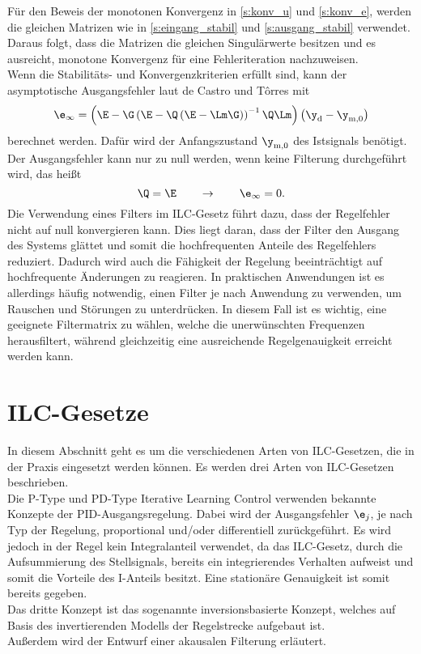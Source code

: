Für den Beweis der monotonen Konvergenz in \autoref{s:konv_u} und \autoref{s:konv_e}, werden die gleichen Matrizen wie in \autoref{s:eingang_stabil} und \autoref{s:ausgang_stabil} verwendet. Daraus folgt, dass die Matrizen die gleichen Singulärwerte besitzen und es ausreicht, monotone Konvergenz für eine Fehleriteration nachzuweisen. \\
Wenn die Stabilitäts- und Konvergenzkriterien erfüllt sind, kann der asymptotische Ausgangsfehler laut de Castro und T\^{o}rres \cite{ilc_anwendung} mit
\begin{equation}
	\label{eq:e_inf}
	\e_{\infty} = \left(\E-\G\left(\E-\Q\left(\E-\Lm\G\right)\right)^{-1}\Q\Lm\right)\left(\y_\mathrm{d} - \y_{\mathrm{m},0}\right)
\end{equation}
berechnet werden. Dafür wird der Anfangszustand $\y_{\mathrm{m},0}$ des Istsignals benötigt. Der Ausgangsfehler kann nur zu null werden, wenn keine Filterung durchgeführt wird, das heißt
\begin{equation}
	\label{eq:Q_E}
	\Q = \E \qquad \rightarrow \qquad \e_{\infty} = 0.
\end{equation}
Die Verwendung eines Filters im ILC-Gesetz führt dazu, dass der Regelfehler nicht auf null konvergieren kann. Dies liegt daran, dass der Filter den Ausgang des Systems glättet und somit die hochfrequenten Anteile des Regelfehlers reduziert. Dadurch wird auch die Fähigkeit der Regelung beeinträchtigt auf hochfrequente Änderungen zu reagieren. In praktischen Anwendungen ist es allerdings häufig notwendig, einen Filter je nach Anwendung zu verwenden, um Rauschen und Störungen zu unterdrücken. In diesem Fall ist es wichtig, eine geeignete Filtermatrix zu wählen, welche die unerwünschten Frequenzen herausfiltert, während gleichzeitig eine ausreichende Regelgenauigkeit erreicht werden kann.

\section{ILC-Gesetze}
In diesem Abschnitt geht es um die verschiedenen Arten von ILC-Gesetzen, die in der Praxis eingesetzt werden können. Es werden drei Arten von ILC-Gesetzen beschrieben. \\
Die P-Type und PD-Type Iterative Learning Control verwenden bekannte Konzepte der PID-Ausgangsregelung. Dabei wird der Ausgangsfehler $\e_j$, je nach Typ der Regelung,  proportional und/oder differentiell zurückgeführt. Es wird jedoch in der Regel kein Integralanteil verwendet, da das ILC-Gesetz, durch die Aufsummierung des Stellsignals, bereits ein integrierendes Verhalten aufweist und somit die Vorteile des I-Anteils besitzt. Eine stationäre Genauigkeit ist somit bereits gegeben. \\
Das dritte Konzept ist das sogenannte inversionsbasierte Konzept, welches auf Basis des invertierenden Modells der Regelstrecke aufgebaut ist.\\
Außerdem wird der Entwurf einer akausalen Filterung erläutert.
